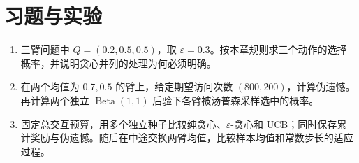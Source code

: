 \section{习题与实验}
\begin{enumerate}
\item 三臂问题中 $Q=(0.2,0.5,0.5)$，取 $\varepsilon=0.3$。按本章规则求三个动作的选择概率，并说明贪心并列的处理为何必须明确。
\item 在两个均值为 $0.7,0.5$ 的臂上，给定期望访问次数 $(800,200)$，计算伪遗憾。再计算两个独立 $\operatorname{Beta}(1,1)$ 后验下各臂被汤普森采样选中的概率。
\item 固定总交互预算，用多个独立种子比较纯贪心、$\varepsilon$-贪心和 UCB；同时保存累计奖励与伪遗憾。随后在中途交换两臂均值，比较样本均值和常数步长的适应过程。
\end{enumerate}





